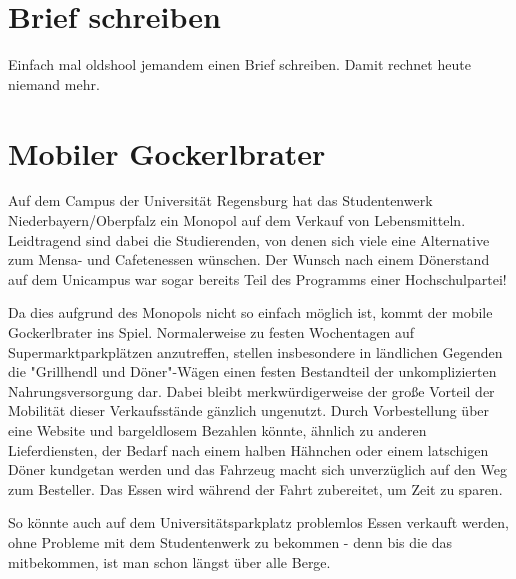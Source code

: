 \documentclass[a5paper,pagesize,10pt,bibtotoc,pointlessnumbers,normalheadings,DIV=9,twoside=false]{scrbook}
\begin{document}



\chapter{Brief schreiben}

Einfach mal oldshool jemandem einen Brief schreiben.
Damit rechnet heute niemand mehr.

\chapter{Mobiler Gockerlbrater}

Auf dem Campus der Universität Regensburg hat das Studentenwerk Niederbayern/Oberpfalz ein Monopol auf dem Verkauf von Lebensmitteln.
Leidtragend sind dabei die Studierenden, von denen sich viele eine Alternative zum Mensa- und Cafetenessen wünschen.
Der Wunsch nach einem Dönerstand auf dem Unicampus war sogar bereits Teil des Programms einer Hochschulpartei!

Da dies aufgrund des Monopols nicht so einfach möglich ist, kommt der mobile Gockerlbrater ins Spiel.
Normalerweise zu festen Wochentagen auf Supermarktparkplätzen anzutreffen, stellen insbesondere in ländlichen Gegenden die "Grillhendl und Döner"-Wägen einen festen Bestandteil der unkomplizierten Nahrungsversorgung dar.
Dabei bleibt merkwürdigerweise der große Vorteil der Mobilität dieser Verkaufsstände gänzlich ungenutzt.
Durch Vorbestellung über eine Website und bargeldlosem Bezahlen könnte, ähnlich zu anderen Lieferdiensten, der Bedarf nach einem halben Hähnchen oder einem latschigen Döner kundgetan werden und das Fahrzeug macht sich unverzüglich auf den Weg zum Besteller.
Das Essen wird während der Fahrt zubereitet, um Zeit zu sparen.

So könnte auch auf dem Universitätsparkplatz problemlos Essen verkauft werden, ohne Probleme mit dem Studentenwerk zu bekommen - denn bis die das mitbekommen, ist man schon längst über alle Berge.
\end{document}
